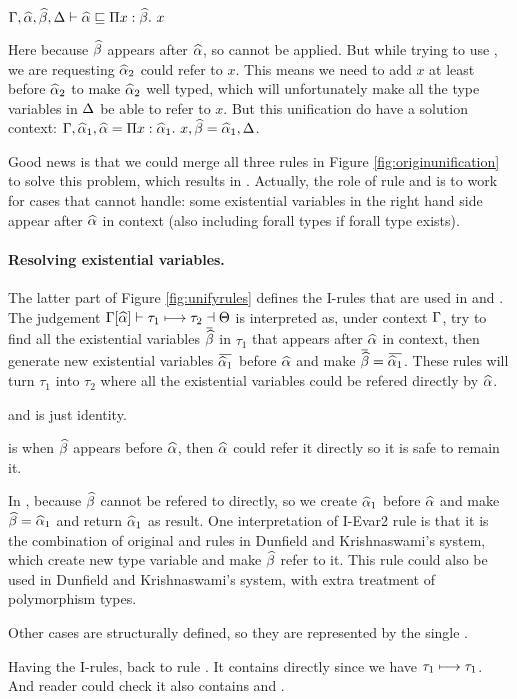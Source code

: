 $\Gamma, \widehat{\alpha}, \widehat{\beta}, \Delta \vdash \widehat{\alpha} \sqsubseteq \Pi x:\widehat{\beta}.~ x$

Here because $\widehat{\beta}$ appears after $\widehat{\alpha}$, so  cannot be applied. But while trying to use , we are requesting $\widehat{\alpha}_2$ could refer to  $x$. This means we need to add $x$ at least before $\widehat{\alpha}_2$ to make $\widehat{\alpha}_2$ well typed, which will unfortunately make all the type variables in $\Delta$ be able to refer to $x$. But this unification do have a solution context: $\Gamma, \widehat{\alpha}_1, \widehat{\alpha} = \Pi x:\widehat{\alpha}_1.~ x, \widehat{\beta} = \widehat{\alpha}_1, \Delta$.

Good news is that we could merge all three rules in Figure \ref{fig:originunification} to solve this problem, which results in . Actually, the role of rule  and  is to work for cases that  cannot handle: some existential variables in the right hand side appear after $\widehat{\alpha}$ in context (also including forall types if forall type exists).

\paragraph{Resolving existential variables.} The latter part of Figure \ref{fig:unifyrules} defines the I-rules that are used in  and . The judgement $\Gamma[\widehat{\alpha}] \vdash \tau_1 \longmapsto \tau_2 \dashv \Theta$ is interpreted as, under context $\Gamma$, try to find all the existential variables $\overbar \genB$ in $\tau_1$ that appears after $\widehat{\alpha}$ in context, then generate new existential variables $\overbar {\genA_1}$ before $\widehat{\alpha}$ and make $\overbar \genB = \overbar {\genA_1}$. These rules will turn $\tau_1$ into $\tau_2$ where all the existential variables could be refered directly by $\widehat{\alpha}$.

 and  is just identity.

 is when $\widehat{\beta}$ appears before $\widehat{\alpha}$, then $\widehat{\alpha}$ could refer it directly so it is safe to remain it.

In , because $\widehat{\beta}$ cannot be refered to directly, so we create $\widehat{\alpha}_1$ before $\widehat{\alpha}$ and make $\widehat{\beta}=\widehat{\alpha}_1$ and return $\widehat{\alpha}_1$ as result. One interpretation of I-Evar2 rule is that it is the combination of original  and  rules in Dunfield and Krishnaswami's system, which create new type variable and make $\widehat{\beta}$ refer to it. This rule could also be used in Dunfield and Krishnaswami's system, with extra treatment of polymorphism types.

Other cases are structurally defined, so they are represented by the single .

Having the I-rules, back to rule . It contains  directly since we have $\tau_1 \longmapsto \tau_1$. And reader could check it also contains  and .
